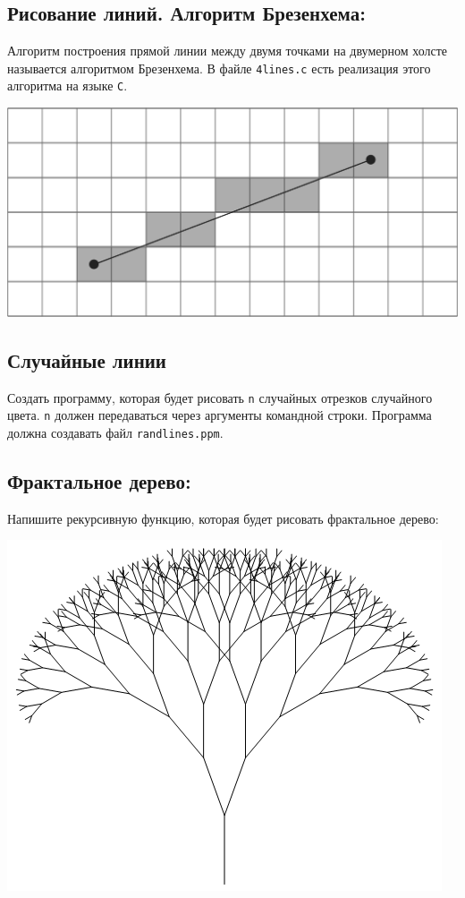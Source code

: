 \documentclass{article}
\begin{document}
\newpage
\subsection*{Рисование линий. Алгоритм Брезенхема:}
Алгоритм построения прямой линии между двумя точками на двумерном холсте называется алгоритмом Брезенхема.
В файле \texttt{4lines.c} есть реализация этого алгоритма на языке \texttt{C}.
\begin{center}
\includegraphics[scale=1]{../images/bresenham.png}
\end{center}

\subsection{Случайные линии}
Создать программу, которая будет рисовать \texttt{n} случайных отрезков случайного цвета. \texttt{n} должен передаваться через аргументы командной строки. Программа должна создавать файл \texttt{randlines.ppm}.

\subsection{Фрактальное дерево:}
Напишите рекурсивную функцию, которая будет рисовать фрактальное дерево:
\begin{center}
\includegraphics[scale=0.4]{../images/treefractal.png}
\end{center}
\end{document}
